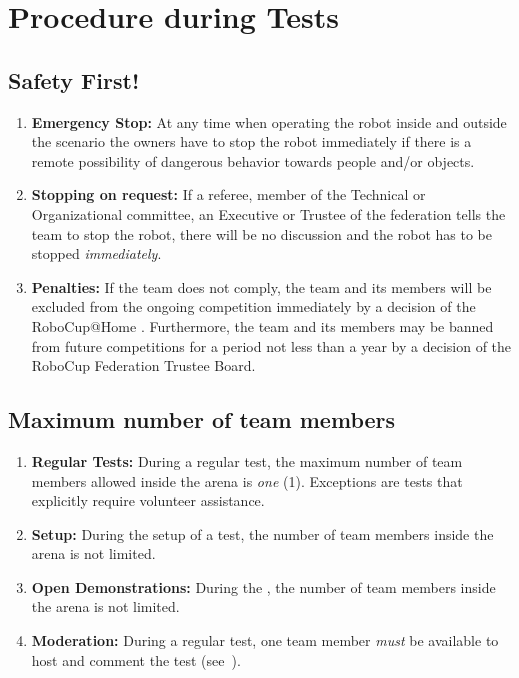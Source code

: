 \section{Procedure during Tests}

\subsection{Safety First!}
\label{rule:safetyfirst}
\begin{enumerate}
	\item \textbf{Emergency Stop:} At any time when operating the robot inside and outside the scenario the owners have to stop the robot immediately if there is a remote possibility of dangerous behavior towards people and/or objects.
	\item \textbf{Stopping on request:} If a referee, member of the Technical or Organizational committee, an Executive or Trustee of the federation tells the team to stop the robot, there will be no discussion and the robot has to be stopped \emph{immediately}.
	\item \textbf{Penalties:} If the team does not comply, the team and its members will be excluded from the ongoing competition immediately by a decision of the RoboCup@Home . 	Furthermore, the team and its members may be banned from future competitions for a period not less than a year by a decision of the RoboCup Federation Trustee Board.
\end{enumerate}

\subsection{Maximum number of team members}
\label{rule:number_of_people}
\begin{enumerate}
	\item \textbf{Regular Tests:} During a regular test, the maximum number of team members allowed inside the arena is \emph{one} (1).
	Exceptions are tests that explicitly require volunteer assistance.
	\item \textbf{Setup:} During the setup of a test, the number of team members inside the arena is not limited.
	\item \textbf{Open Demonstrations:} During the , the number of team members inside the arena is not limited.
	\item \textbf{Moderation:} During a regular test, one team member \emph{must} be available to host and comment the test (see~).
\end{enumerate}

